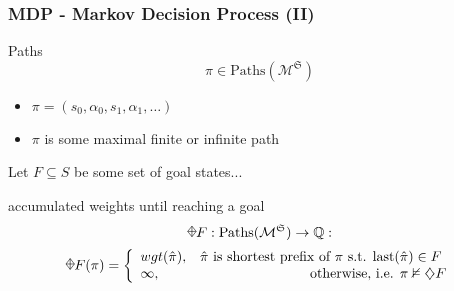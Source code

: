 \documentclass[onlymath]{beamer}
\begin{document}
\newcommand{\rawdiaplus}{%
	\begin{tikzpicture}
	\useasboundingbox (-0.7ex, -0.9ex) rectangle (0.7ex, 0.9ex);
	\node (w) at (-0.7ex,0) {};
	\node (e) at (+0.7ex,0) {};
	\node (s) at (0,-0.9ex) {};
	\node (n) at (0,+0.9ex) {};
	\draw (n.center) -- (e.center) -- (s.center) -- (w.center) -- (n.center);
	\draw (n.center) -- (s.center);
	\draw (e.center) -- (w.center);
	\end{tikzpicture}
}
\begin{frame}
	\frametitle{MDP - Markov Decision Process (II)}
	\begin{block}{Paths}
		\[
			\pi \in \mathrm{Paths}(\mathcal{M}^{\mathfrak{S}})
		\] \pause \begin{itemize}
			\item $\pi = (s_0,\alpha_0,s_1,\alpha_1, \dots)$ \pause
			\item $\pi$ is some maximal finite or infinite path \pause
		\end{itemize}
	\end{block}
	Let $F \subseteq S$ be some set of goal states... \pause
	\begin{block}{accumulated weights until reaching a goal}
	\[
	\rawdiaplus F : \mathrm{Paths}(\mathcal{M}^{\mathfrak{S}}) \to \mathbb{Q} :
	\]
	\[ 
	\rawdiaplus F (\pi) = \bigg\{\begin{array}{lr}
	wgt(\hat{\pi}), & \text{$\hat{\pi}$ is shortest prefix of $\pi$ s.t. $\mathrm{last}(\hat{\pi}) \in F$  }\\
	\infty, & \text{otherwise, i.e. $\pi \nvDash \diamondsuit F$}
	\end{array}
	\]
	\end{block}

\end{frame}
\begin{comment}
	
\section{Essential Definitions}

\begin{frame}
\begin{itemize}
	\item MDP
	\item Expectation
	\item Conditional Expectation
	\item Variance-penalized Expectation
	\item schedulers, kind of schedulers...
\end{itemize}
\end{frame}
\end{comment}
\end{document}
